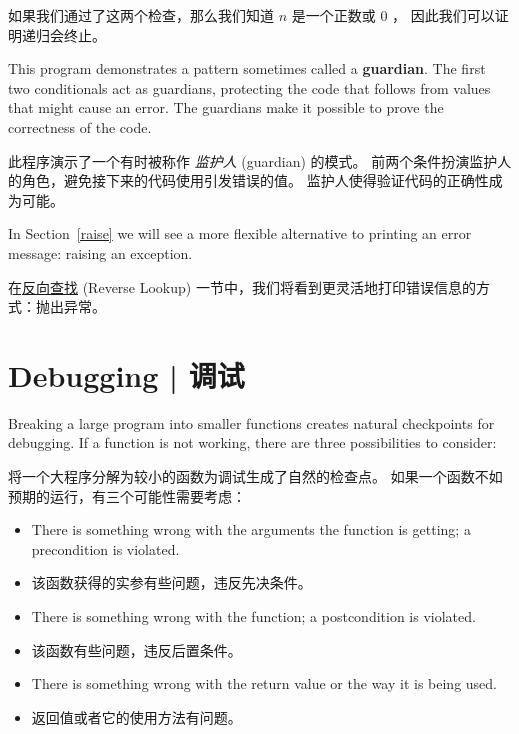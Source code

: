如果我们通过了这两个检查，那么我们知道 $n$ 是一个正数或 $0$ ， 因此我们可以证明递归会终止。
  

This program demonstrates a pattern sometimes called a {\bf guardian}.
The first two conditionals act as guardians, protecting the code that
follows from values that might cause an error.  The guardians make it
possible to prove the correctness of the code.

此程序演示了一个有时被称作 {\em 监护人} (guardian) 的模式。
前两个条件扮演监护人的角色，避免接下来的代码使用引发错误的值。
监护人使得验证代码的正确性成为可能。


In Section~\ref{raise} we will see a more flexible alternative to printing
an error message: raising an exception.

在\hyperref[raise]{反向查找} (Reverse Lookup) 一节中，我们将看到更灵活地打印错误信息的方式：抛出异常。


\section{Debugging  |  调试}
\label{factdebug}

Breaking a large program into smaller functions creates natural
checkpoints for debugging.  If a function is not
working, there are three possibilities to consider:

将一个大程序分解为较小的函数为调试生成了自然的检查点。
如果一个函数不如预期的运行，有三个可能性需要考虑：


\begin{itemize}

\item There is something wrong with the arguments the function
is getting; a precondition is violated.

\item 该函数获得的实参有些问题，违反先决条件。

\item There is something wrong with the function; a postcondition
is violated.

\item 该函数有些问题，违反后置条件。

\item There is something wrong with the return value or the
way it is being used.

\item 返回值或者它的使用方法有问题。

\end{itemize}

